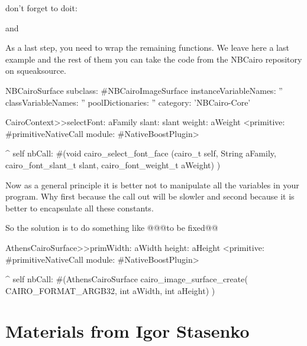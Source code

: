 \documentclass[a4paper,10pt,twoside]{book}
\begin{document}
don't forget to doit:


and


As a last step, you need to wrap the remaining functions.
We leave here a last example and the rest of them you can
take the code from the NBCairo repository on squeaksource.

\begin{classdef}{}
NBCairoSurface subclass: #NBCairoImageSurface
	instanceVariableNames: ''
	classVariableNames: ''
	poolDictionaries: ''
	category: 'NBCairo-Core'
\end{classdef}

\begin{code}{}
CairoContext>>selectFont: aFamily slant: slant weight: aWeight
	<primitive: #primitiveNativeCall module: #NativeBoostPlugin>
	
	^ self nbCall: #(void cairo_select_font_face (cairo_t self,
                                                         String aFamily,
                                                         cairo_font_slant_t slant,
                                                         cairo_font_weight_t aWeight) )
\end{code}


Now as a general principle it is better not to manipulate all the
variables in your program. Why first because the call out will be
slowler and second because it is better to encapsulate all these
constants. 

So the solution is to do something like
@@@to be fixed@@
\begin{code}{}
AthensCairoSurface>>primWidth: aWidth height: aHeight
	<primitive: #primitiveNativeCall module: #NativeBoostPlugin>
	
	^ self nbCall: #(AthensCairoSurface cairo_image_surface_create(
				CAIRO_FORMAT_ARGB32,
					int aWidth,
					int aHeight) )
	
\end{code}

\section{Materials from Igor Stasenko}
\end{document}
